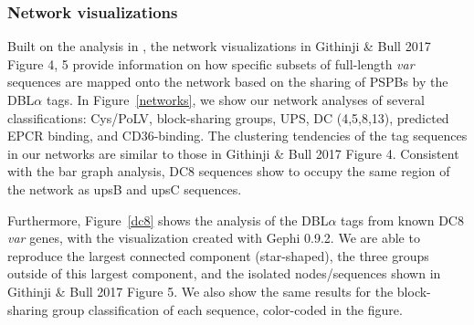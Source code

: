 \documentclass[10pt,twocolumn,superscriptaddress]{revtex4-1}
\newcommand{\var}{{\it var}\xspace}
\newcommand{\dbla}{{DBL$\alpha$}\xspace}
\newcommand{\cidra}{{CIDR$\alpha$}\xspace}
\newcommand{\cp}{{Cys/PoLV}\xspace}
\newcommand{\paper}{{Githinji \& Bull 2017}\xspace}
\newcommand{\figdir}{figures/}
\begin{document}
\subsubsection{Network visualizations}
Built on the analysis in \cite{bull2008}, the network visualizations in \paper Figure 4, 5 provide information on how specific subsets of full-length \var sequences are mapped onto the network based on the sharing of PSPBs by the \dbla tags. In Figure~\ref{networks}, we show our network analyses of several classifications: \cp, block-sharing groups, UPS, DC (4,5,8,13), predicted EPCR binding, and CD36-binding. The clustering tendencies of the tag sequences in our networks are similar to those in \paper Figure 4. Consistent with the bar graph analysis, DC8 sequences show to occupy the same region of the network as upsB and upsC sequences.  

%

Furthermore, Figure~\ref{dc8} shows the analysis of the \dbla tags from known DC8 \var genes, with the visualization created with Gephi 0.9.2. We are able to reproduce the largest connected component (star-shaped), the three groups outside of this largest component, and the isolated nodes/sequences shown in \paper Figure 5. We also show the same results for the block-sharing group classification of each sequence, color-coded in the figure.
\end{document}
